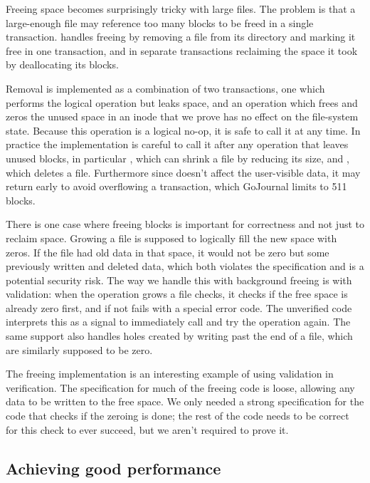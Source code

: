 Freeing space becomes surprisingly tricky with large files. The problem is that
a large-enough file may reference too many blocks to be
freed in a single transaction.
\sys handles freeing by removing a file from its directory and marking it free in
one transaction, and in separate transactions reclaiming the space it took by deallocating
its blocks.

Removal is implemented as a combination of two transactions,
one which performs the logical operation but leaks space, and an operation
 which frees and zeros the unused space in an inode that
we prove has no effect on the file-system state. Because this operation is a
logical no-op, it is safe to call it at any time. In practice the implementation
is careful to call it after any operation that leaves unused blocks, in
particular , which can shrink a file by reducing its size, and
, which deletes a file. Furthermore since  doesn't
affect the user-visible data, it may return early to avoid overflowing a
transaction, which GoJournal limits to 511 blocks.

There is one case where freeing blocks is important for correctness and not just to reclaim space. Growing a file is supposed to logically fill the new space with
zeros. If the file had old data in that space, it would not be zero but some
previously written and deleted data, which both violates the specification and
is a potential security risk. The way we handle this with background freeing is
with validation: when the  operation grows a file checks, it checks if the
free space is already zero first, and if not fails with a special error code. The
unverified code interprets this as a signal to immediately call
 and try the operation again. The same support also handles
holes created by writing past the end of a file, which are similarly supposed to
be zero.

The freeing implementation is an interesting example of using validation in
verification. The specification for much of the freeing code is loose, allowing
any data to be written to the free space. We only needed a strong specification
for the code that checks if the zeroing is done; the rest of the code needs to
be correct for this check to ever succeed, but we aren't required to prove it.

\subsection{Achieving good performance}

